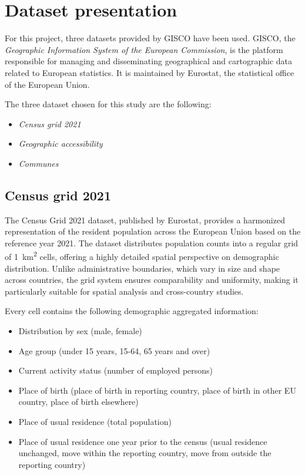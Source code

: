\section{Dataset presentation}

For this project, three datasets provided by GISCO have been used.
GISCO, the \emph{Geographic Information System of the European Commission}, is the platform responsible for managing and disseminating geographical and cartographic data related to European statistics.
It is maintained by Eurostat, the statistical office of the European Union.

The three dataset chosen for this study are the following:
\begin{itemize}
	\item \emph{Census grid 2021}
	\item \emph{Geographic accessibility}
	\item \emph{Communes}
\end{itemize}


\subsection{Census grid 2021}

The Census Grid 2021 dataset, published by Eurostat, provides a harmonized representation of the resident population across the European Union based on the reference year 2021.
The dataset distributes population counts into a regular grid of \qty{1}{km^2} cells, offering a highly detailed spatial perspective on demographic distribution.
Unlike administrative boundaries, which vary in size and shape across countries, the grid system ensures comparability and uniformity, making it particularly suitable for spatial analysis and cross-country studies.

Every cell contains the following demographic aggregated information:
\begin{itemize}
	\item Distribution by sex (male, female)
	\item Age group (under 15 years, 15-64, 65 years and over)
	\item Current activity status (number of employed persons)
	\item Place of birth (place of birth in reporting country, place of birth in other EU country, place of birth elsewhere)
	\item Place of usual residence (total population)
	\item Place of usual residence one year prior to the census (usual residence unchanged, move within the reporting country, move from outside the reporting country)
\end{itemize}

